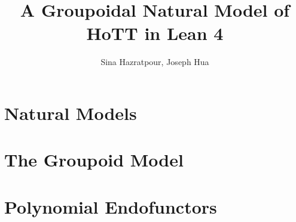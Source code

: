 \documentclass[a4paper]{report}
\title{A Groupoidal Natural Model of HoTT in Lean 4}
\author{Sina Hazratpour, Joseph Hua}
\numberwithin{equation}{section}
\begin{document}
\maketitle

\section{Natural Models}


\section{The Groupoid Model}


\section{Polynomial Endofunctors}



{}

\end{document}
